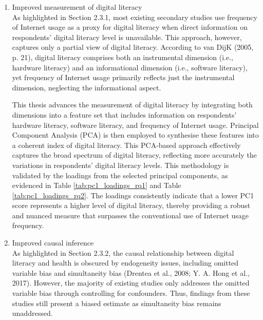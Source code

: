 \begin{enumerate}[wide=0pt, leftmargin=*, labelwidth=0pt, labelindent=\parindent, itemindent=0pt]
    \item Improved measurement of digital literacy \\
    As highlighted in Section 2.3.1, most existing secondary studies use frequency of Internet usage as a proxy for digital literacy when direct information on respondents' digital literacy level is unavailable. This approach, however, captures only a partial view of digital literacy. According to van DijK (2005, p. 21), digital literacy comprises both an instrumental dimension (i.e., hardware literacy) and an informational dimension (i.e., software literacy), yet frequency of Internet usage primarily reflects just the instrumental dimension, neglecting the informational aspect.

    This thesis advances the measurement of digital literacy by integrating both dimensions into a feature set that includes information on respondents' hardware literacy, software literacy, and frequency of Internet usage. Principal Component Analysis (PCA) is then employed to synthesise these features into a coherent index of digital literacy. This PCA-based approach effectively captures the broad spectrum of digital literacy, reflecting more accurately the variations in respondents' digital literacy levels. This methodology is validated by the loadings from the selected principal components, as evidenced in Table \ref{tab:pc1_loadings_rq1} and Table \ref{tab:pc1_loadings_rq2}. The loadings consistently indicate that a lower PC1 score represents a higher level of digital literacy, thereby providing a robust and nuanced measure that surpasses the conventional use of Internet usage frequency.

    \item Improved causal inference \\
    As highlighted in Section 2.3.2, the causal relationship between digital literacy and health is obscured by endogeneity issues, including omitted variable bias and simultaneity bias (Drentea et al., 2008; Y. A. Hong et al., 2017). However, the majority of existing studies only addresses the omitted variable bias through controlling for confounders. Thus, findings from these studies still present a biased estimate as simultaneity bias remains unaddressed.


\end{enumerate}
